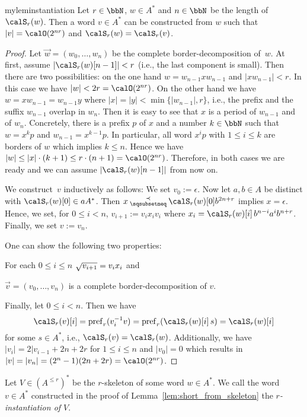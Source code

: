 \begin{restatable}{mylem}{instantiation}\label{lem:short_from_skeleton}
	Let $r\in\bbN$, $w\in A^*$ and $n\in\bbN$ be the length of $\calS_r(w)$. Then a word $v\in A^*$ can be constructed from $w$ such that $|v|=\calO(2^{nr})$ and $\calS_r(w)=\calS_r(v)$.
\end{restatable}
\begin{proof}
	Let $\vec{w}=(w_0,\dots,w_n)$ be the complete border-decomposition of~$w$. At first, assume $|\calS_r(w)[n-1]|<r$ (i.e., the last component is small). Then there are two possibilities: on the one hand $w=w_{n-1}xw_{n-1}$ and $|xw_{n-1}|<r$. In this case we have $|w|<2r=\calO(2^{nr})$. On the other hand we have $w=xw_{n-1}=w_{n-1}y$ where $|x|=|y|<\min\{|w_{n-1}|,r\}$, i.e., the prefix and the suffix $w_{n-1}$ overlap in $w_n$. Then it is easy to see that $x$ is a period of $w_{n-1}$ and of $w_n$. Concretely, there is a prefix $p$ of $x$ and a number $k\in\bbN$ such that $w=x^kp$ and $w_{n-1}=x^{k-1}p$. In particular, all word $x^ip$ with $1\leq i\leq k$ are borders of $w$ which implies $k\leq n$. Hence we have $|w|\leq|x|\cdot(k+1)\leq r\cdot(n+1)=\calO(2^{nr})$. Therefore, in both cases we are ready and we can assume $|\calS_r(w)[n-1]|$ from now on.
	
	We construct~$v$ inductively as follows: We set $v_0:=\epsilon$. Now let $a,b\in A$ be distinct with $\calS_r(w)[0]\in aA^*$. Then $x\presuf\calS_r(w)[0]b^{2n+r}$ implies $x=\epsilon$. Hence, we set, for $0\leq i<n$, $v_{i+1}:=v_ix_iv_i$ where $x_i=\calS_r(w)[i]\,b^{n-i}a^ib^{n+r}$. Finally, we set $v:=v_{n}$.
	
	One can show the following two properties:
	\begin{alphaenumerate}
		\item For each $0\leq i\leq n$ $\sqrt{v_{i+1}}=v_ix_i$ and
		\item $\vec{v}=(v_0,\dots,v_{n})$ is a complete border-decomposition of $v$.
	\end{alphaenumerate}
Finally, let $0\leq i<n$. Then we have
	\[\calS_r(v)[i]=\pref_r(\inv{v_i}v)=\pref_r(\calS_r(w)[i]\,s)=\calS_r(w)[i]\]
	for some $s\in A^*$, i.e., $\calS_r(v)=\calS_r(w)$. Additionally, we have $|v_i|=2|v_{i-1}+2n+2r$ for $1\leq i\leq n$ and $|v_0|=0$ which results in $|v|=|v_n|=(2^n-1)(2n+2r)=\calO(2^{nr})$.
\end{proof}

Let $V\in (A^{\leq r})^*$ be the $r$-skeleton of some word $w\in A^*$. We call the word $v\in A^*$ constructed in the proof of Lemma~\ref{lem:short_from_skeleton} the \emph{$r$-instantiation of $V$}.